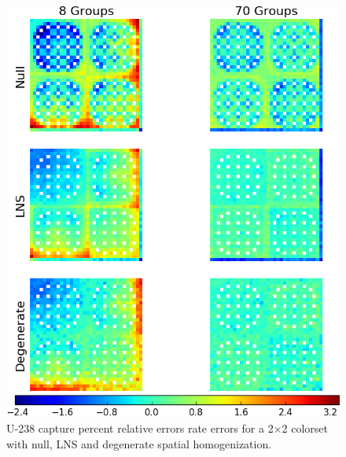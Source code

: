 \begin{figure}[h!]
\centering
\includegraphics[width=\linewidth]{figures/patterns/lns/reflector/capt-err}
\vspace{2mm}
\caption[U-238 capture rate errors for a 2$\times$2 colorset with a reflector]{U-238 capture percent relative errors rate errors for a 2$\times$2 colorset with null, \ac{LNS} and degenerate spatial homogenization.}
\label{fig:chap9-reflector-lns-capt-err}
\end{figure}

\clearpage

